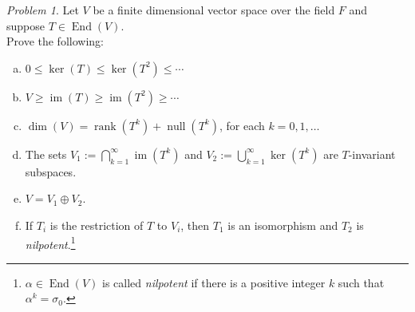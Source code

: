 \documentclass[11pt]{paper}
\theoremstyle{remark}
\newtheorem{problem}{Problem}
\newcommand{\<}{\ensuremath{\langle}}
\renewcommand{\>}{\ensuremath{\rangle}}
\newcommand\End{\ensuremath{\operatorname{End}}}
\newcommand{\nulity}[1]{\ensuremath{\operatorname{null}(#1)}}
\renewcommand{\ker}[1]{\ensuremath{\operatorname{ker}(#1)}}
\renewcommand{\dim}[1]{\ensuremath{\operatorname{dim}(#1)}}
\newcommand\im[1]{\ensuremath{\operatorname{im}(#1)}}
\newcommand{\rank}[1]{\ensuremath{\operatorname{rank}(#1)}}
\renewcommand{\leq}{\ensuremath{\leqslant}}
\renewcommand{\geq}{\ensuremath{\geqslant}}
\begin{document}
\begin{problem}
\item Let $V$ be a finite dimensional vector space over the field $F$ and 
suppose $T \in \End(V)$.\\
Prove the following:
  \begin{enumerate}[(a)]
  \item
$0 \leq \ker{T} \leq \ker{T^2} \leq \cdots$
\item
$V \geq \im{T} \geq \im{T^2} \geq \cdots$
\item $\dim{V} = \rank{T^k} + \nulity{T^k}$, for each $k= 0, 1, \dots$
\item The sets
    $V_1 := \bigcap_{k=1}^\infty \im{T^k}$ and
    $V_2 := \bigcup_{k=1}^\infty \ker{T^k}$ are $T$-invariant subspaces.
  \item $V = V_1 \oplus V_2$.
  \item If $T_i$ is the restriction of $T$ to $V_i$, then 
    $T_1$ is an isomorphism and $T_2$ is
    \emph{nilpotent}.\footnote{$\alpha\in \End(V)$ is called \emph{nilpotent} if
      there is a positive integer $k$ such that $\alpha^k = \sigma_0$.} 
  \end{enumerate}
\end{problem}

\probskip
\end{document}
